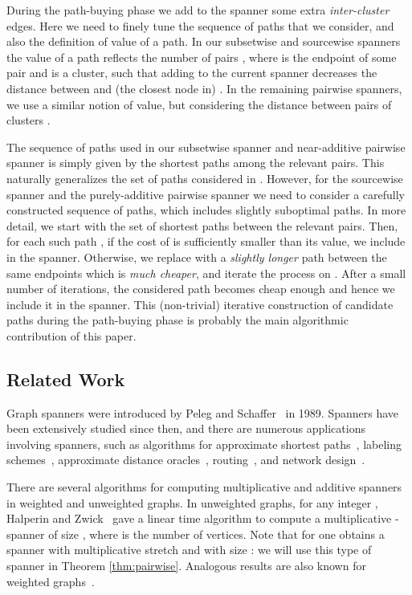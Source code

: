 \documentclass[a4paper,11pt]{article}
\theoremstyle{definition}
\begin{document}
During the path-buying phase we add to the spanner some extra \emph{inter-cluster} edges. Here we need to finely tune the sequence of paths that we consider, and also the definition of value of a path. In our subsetwise and sourcewise spanners the value of a path  reflects the number of pairs , where  is the endpoint of some pair and  is a cluster, such that adding  to the current spanner decreases the distance between  and (the closest node in) . In the remaining pairwise spanners, we use a similar notion of value, but considering the distance between pairs of clusters . 

The sequence of paths used in our subsetwise spanner and near-additive pairwise spanner is simply given by the shortest paths among the relevant pairs. This naturally generalizes the set of paths considered in \cite{BKMP05}. However, for the sourcewise spanner and the purely-additive pairwise spanner we need to consider a carefully constructed sequence of paths, which includes slightly suboptimal paths. In more detail, we start with the set of shortest paths between the relevant pairs. Then, for each such path , if the cost of  is sufficiently smaller than its value, we include  in the spanner. Otherwise, we replace  with a \emph{slightly longer} path  between the same endpoints which is \emph{much cheaper}, and iterate the process on . After a small number of iterations, the considered path becomes cheap enough and hence we include it in the spanner. 
This (non-trivial) iterative construction of candidate paths during the path-buying phase is probably the main algorithmic contribution of this paper. 


\subsection{Related Work}
\label{sec:related}


Graph spanners were introduced by Peleg and Schaffer~\cite{PS89} in 1989. Spanners have been extensively 
studied since then, and there are numerous applications involving spanners, such as algorithms for 
approximate shortest paths~\cite{ABCP98,C93,E05}, labeling schemes~\cite{P00,GPPR01}, 
approximate distance oracles~\cite{TZ01,BS04,BK06}, 
routing~\cite{AP92,C01,CW04}, and network design~\cite{PU89}. 

There are several algorithms for computing multiplicative and additive spanners in weighted and 
unweighted graphs. In unweighted graphs, for any integer , Halperin and Zwick~\cite{HZ96} 
gave a linear time algorithm to compute a multiplicative -spanner of size , 
where  is the number of vertices. 
Note that for  one obtains a spanner with multiplicative stretch  and with size : we will use this type of spanner in Theorem \ref{thm:pairwise}. 
Analogous results are also known for weighted graphs~\cite{BS03,RMZ05,RZ04}.
\end{document}

